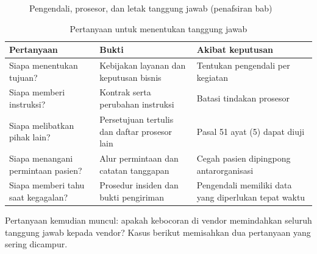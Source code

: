 \begin{figure}[!htb]
  \centering
  
  \caption{Pengendali, prosesor, dan letak tanggung jawab (penafsiran bab)}
  \label{fig:ch07-peran}
\end{figure}

\begin{table}[!htb]
  \centering\small
  \caption{Pertanyaan untuk menentukan tanggung jawab}\label{tab:ch07-peran}
  \begin{tabularx}{\textwidth}{|>{\raggedright\arraybackslash}X|>{\raggedright\arraybackslash}X|>{\raggedright\arraybackslash}X|}
    \hline
    \textbf{Pertanyaan} & \textbf{Bukti} & \textbf{Akibat keputusan} \\ \hline
    Siapa menentukan tujuan? & Kebijakan layanan dan keputusan bisnis & Tentukan pengendali per
    kegiatan \\ \hline
    Siapa memberi instruksi? & Kontrak serta perubahan instruksi & Batasi tindakan prosesor \\
    \hline
    Siapa melibatkan pihak lain? & Persetujuan tertulis dan daftar prosesor lain & Pasal 51 ayat (5)
    dapat diuji \\ \hline
    Siapa menangani permintaan pasien? & Alur permintaan dan catatan tanggapan & Cegah pasien
    dipingpong antarorganisasi \\ \hline
    Siapa memberi tahu saat kegagalan? & Prosedur insiden dan bukti pengiriman & Pengendali memiliki
    data yang diperlukan tepat waktu \\ \hline
  \end{tabularx}
\end{table}

Pertanyaan kemudian muncul: apakah kebocoran di vendor memindahkan seluruh tanggung jawab kepada
vendor? Kasus berikut memisahkan dua pertanyaan yang sering dicampur.

